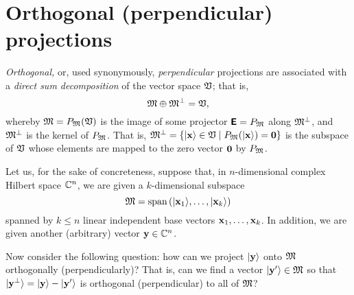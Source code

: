 


\section{Orthogonal (perpendicular) projections}

{\em Orthogonal,} or, used synonymously,
{\em perpendicular} projections
are associated with a {\em direct sum decomposition} of the vector space ${\frak V}$;
that is,
\begin{equation}
 {\frak M}\oplus {\frak M}^\perp ={\frak V},
\label{2012-m-ch-fdvs-perp}
\end{equation}
whereby $ {\frak M}= P_{\frak M}({\frak V})$
is the image of some projector $\textsf{\textbf{E}}=P_{\frak M}$
along ${\frak M}^\perp$, and  ${\frak M}^\perp$ is
the kernel of $P_{\frak M}$.
That is, ${\frak M}^\perp = \left\{ \vert {\bf x} \rangle \in {\frak V} \mid P_{\frak M}(\vert {\bf x} \rangle ) = {\bf 0}\right\}$
is the subspace of ${\frak V}$
whose elements are mapped to the zero vector ${\bf 0}$ by $P_{\frak M}$.


Let us, for the sake of concreteness,
suppose that, in $n$-dimensional complex Hilbert space
${\Bbb C}^n$, we are given a $k$-dimensional subspace
\begin{equation}
{\frak M} = \textrm{span}\left(\vert {\bf x}_1\rangle ,\ldots ,\vert {\bf x}_k \right\rangle )
\end{equation}
spanned
by  $k \le n$  linear independent base vectors ${\bf x}_1,\ldots ,{\bf x}_k$.
In addition, we are given another (arbitrary) vector ${\bf y} \in {\Bbb C}^n$.

Now consider the following question:
how can we project $\vert {\bf y} \rangle $ onto ${\frak M}$ orthogonally (perpendicularly)?
That is, can we find a vector $\vert {\bf y}' \rangle  \in {\frak M}$ so that
$\vert {\bf y}^\perp \rangle  = \vert {\bf y} \rangle  - \vert {\bf y}' \rangle $
is orthogonal (perpendicular) to all of ${\frak M}$?

